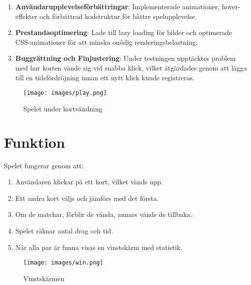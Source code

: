 \documentclass[a4paper,12pt]{article}
\begin{document}
\begin{enumerate}
    Dessutom uppdaterades CSS för att:
    \begin{itemize}
        \item Skapa en centrerad overlay med mörk bakgrund
        \item Designa en tematiskt passande container med gyllene ram
        \item Matcha spelets färger och typsnitt
        \item Implementera animationer och hover-effekter
        \item Göra designen responsiv
    \end{itemize}
    
    Slutligen uppdaterades JavaScript för att:
    \begin{itemize}
        \item Cacha de nya DOM-elementen
        \item Lägga till en event-lyssnare för "Play Again"-knappen
        \item Ersätta den gamla alerten med den nya vinstmodulen
        \item Hantera visning och gömning av modalen
    \end{itemize}
    Vinstskärmen dyker nu upp med en mjuk fade-in-effekt när spelaren vinner och visar statistik, en gratulationsbild samt en knapp för att starta om spelet.
    \item \textbf{Användarupplevelseförbättringar}: Implementerade animationer, hover-effekter och förbättrad kodstruktur för bättre spelupplevelse.
    \item \textbf{Prestandaoptimering}: Lade till lazy loading för bilder och optimerade CSS-animationer för att minska onödig renderingsbelastning.
    \item \textbf{Buggrättning och Finjustering}: Under testningen upptäcktes problem med hur korten vände sig vid snabba klick, vilket åtgärdades genom att lägga till en tidsfördröjning innan ett nytt klick kunde registreras.
\end{enumerate}

\begin{figure}[h]
    \centering
    \texttt{[image: images/play.png]}
    \caption{Spelet under kortvändning}
    \label{fig:game_play}
\end{figure}

\section*{Funktion}
Spelet fungerar genom att:
\begin{enumerate}
    \item Användaren klickar på ett kort, vilket vänds upp.
    \item Ett andra kort väljs och jämförs med det första.
    \item Om de matchar, förblir de vända, annars vänds de tillbaka.
    \item Spelet räknar antal drag och tid.
    \item När alla par är funna visas en vinstskärm med statistik.
\end{enumerate}

\begin{figure}[h]
    \centering
    \texttt{[image: images/win.png]}
    \caption{Vinstskärmen}
    \label{fig:game_win}
\end{figure}
\end{document}
